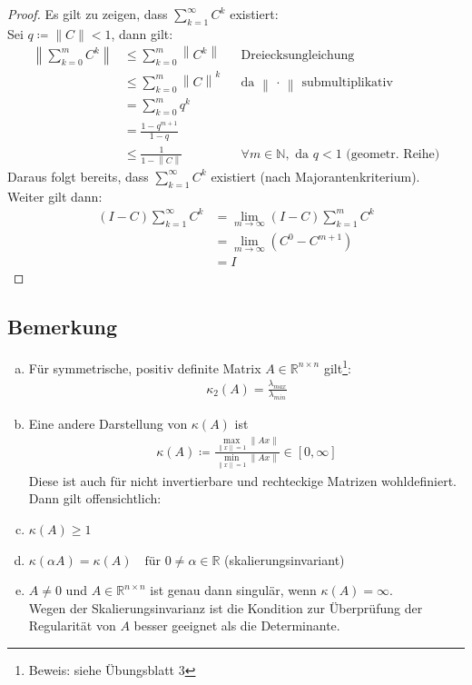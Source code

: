 \documentclass[ngerman,fontsize=11pt, paper=a4, parskip=half, titlepage=true, toc=bib]{scrbook}
\newcommand{\R}{\mathds{R}}
\newcommand{\Renn}{\mathds{R}^{n\times n}}
\newcommand{\N}{\mathds{N}}
\newcommand{\nn}[1]{\left\| #1 \right\|}
\begin{document}
\begin{proof}
Es gilt zu zeigen, dass $\sum_{k=1}^{\infty}C^k$ existiert: \\
Sei $q\coloneqq \|C\| < 1$, dann gilt: 
\begin{align*}
	\nn{ \sum_{k=0}^{m} C^k } &\leq \sum_{k=0}^{m} \nn{C^k }  && \text{Dreiecksungleichung} \\
								 &\leq \sum_{k=0}^{m}\nn{C}^k && \text{da $\nn{\,\cdot\,}$ submultiplikativ}\\
								 &=\sum_{k=0}^{m}q^k  \\
								 &= \frac{1-q^{m+1}}{1-q} \\
								 &\leq \frac{1}{1-\nn{C}} && \forall m\in \N, \text{ da } q<1 \text{ (geometr. Reihe)}
\end{align*}
Daraus folgt bereits, dass $\sum_{k=1}^{\infty}C^k$ existiert (nach Majorantenkriterium).\\
Weiter gilt dann:
\begin{align*}
	(I-C) \sum_{k=1}^{\infty}C^k &= \lim\limits_{m\rightarrow \infty}(I-C)   \sum_{k=1}^{m}C^k \\
													&= \lim\limits_{m\rightarrow \infty} (C^0-C^{m+1}) \\
													&=I 
\end{align*}
\end{proof}

\subsection{Bemerkung}\label{3.2.13}
\begin{enumerate}[a)]
	\item Für symmetrische, positiv definite Matrix $A\in \Renn$ gilt\footnote{Beweis: siehe Übungsblatt 3}: 
	\begin{gather}
		\kappa_2(A) = \frac{\lambda_{max}}{\lambda_{min}} \label{III.2.13}
	\end{gather}
	\item Eine andere Darstellung von $\kappa(A)$ ist
	\begin{gather}
		\kappa(A) \coloneqq 
		\frac{\underset{\|x\|=1}{\max}\|Ax\|}{\underset{\|x\|=1}{\min}\|Ax\|} \in  \left[ 0, \infty \right]
			 \label{III.2.14}
	\end{gather}
	Diese ist auch für nicht invertierbare und rechteckige Matrizen wohldefiniert. \\
	Dann gilt offensichtlich:
	\item $\kappa(A) \geq 1$
	\item $\kappa(\alpha A)=\kappa(A) \quad \text{für } 0\neq\alpha\in\R$ (skalierungsinvariant)
	\item $A\neq 0$ und $A\in\Renn $ ist genau dann singulär, wenn $\kappa(A)=\infty$. \\
			Wegen der Skalierungsinvarianz ist die Kondition zur Überprüfung der Regularität von $A$ 
			besser geeignet als die Determinante.
	\end{enumerate}
	
\end{document}
